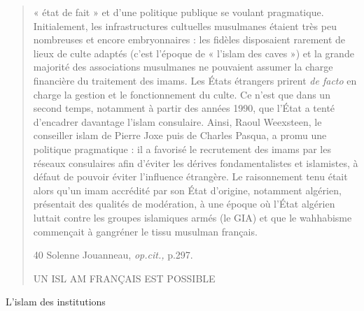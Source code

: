 \begin{quote}
« état de fait » et d'une politique publique se voulant pragmatique.
Initialement, les infrastructures cultuelles musulmanes étaient très peu
nombreuses et encore embryonnaires : les fidèles disposaient rarement de
lieux de culte adaptés (c'est l'époque de « l'islam des caves ») et la
grande majorité des associations musulmanes ne pouvaient assumer la
charge financière du traitement des imams. Les États étrangers prirent
\emph{de facto} en charge la gestion et le fonctionnement du culte. Ce
n'est que dans un second temps, notamment à partir des années 1990, que
l'État a tenté d'encadrer davantage l'islam consulaire. Ainsi, Raoul
Weexsteen, le conseiller islam de Pierre Joxe puis de Charles Pasqua, a
promu une politique pragmatique : il a favorisé le recrutement des imams
par les réseaux consulaires afin d'éviter les dérives fondamentalistes
et islamistes, à défaut de pouvoir éviter l'influence étrangère. Le
raisonnement tenu était alors qu'un imam accrédité par son État
d'origine, notamment algérien, présentait des qualités de modération, à
une époque où l'État algérien luttait contre les groupes islamiques
armés (le GIA) et que le wahhabisme commençait à gangréner le tissu
musulman français.

40 Solenne Jouanneau, \emph{op.cit.,} p.297.

UN ISL AM FRANÇAIS EST POSSIBLE
\end{quote}

L'islam des institutions

